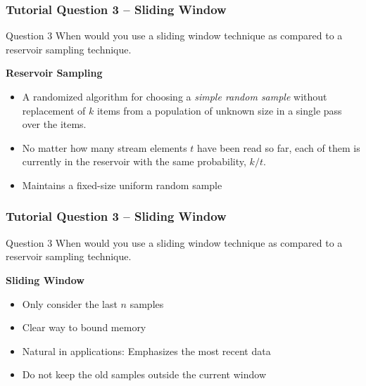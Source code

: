 \documentclass[aspectratio=169, 10pt]{beamer}
\begin{document}
\begin{frame}
    \frametitle{Tutorial Question 3 -- Sliding Window}
    
    \begin{block}{Question 3}
        When would you use a sliding window technique as compared to a reservoir sampling technique.
    \end{block}

    \textbf{Reservoir Sampling}
    \begin{itemize}
        \item A randomized algorithm for choosing a {\em simple random sample} without
        replacement of $k$ items from a population of unknown size in a single
        pass over the items.
        \item No matter how many stream elements $t$ have been read
        so far, each of them is currently in the reservoir with the same
        probability, $k/t$.
        \item Maintains a fixed-size uniform random sample
    \end{itemize}
\end{frame}

\begin{frame}
    \frametitle{Tutorial Question 3 -- Sliding Window}
    
    \begin{block}{Question 3}
        When would you use a sliding window technique as compared to a reservoir sampling technique.
    \end{block}

    \textbf{Sliding Window}
    \begin{itemize}
        \item Only  consider the last $n$ samples
        \item Clear way to bound memory
        \item Natural in applications: Emphasizes the most recent data
        \item Do not keep the old samples outside the current window
    \end{itemize}
\end{frame}
\end{document}
